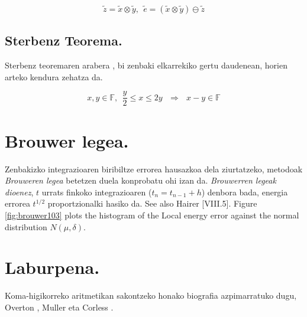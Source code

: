 \begin{equation*}
\tilde{z}=\tilde{x}\otimes\tilde{y}, \ \ \tilde{e}=(\tilde{x}\otimes\tilde{y})\ominus \tilde{z}
\end{equation*}


\subsection*{Sterbenz Teorema.}
Sterbenz teoremaren arabera \cite{Sterbenz1973}, bi zenbaki elkarrekiko  gertu daudenean,  horien arteko kendura zehatza da.

\begin{equation}
\label{eq:4311}
x,y \in \mathbb{F}, \ \ \frac{y}{2}\leq x \leq 2y \ \ \ \Rightarrow \ \ \ x-y\in \mathbb{F}
\end{equation}


\section{Brouwer legea.}

Zenbakizko integrazioaren biribiltze errorea hausazkoa dela ziurtatzeko, metodoak \emph{Brouweren legea} \cite{Brouwer1937} betetzen duela konprobatu ohi izan da. \emph{Brouwerren legeak dioenez}, $t$ urrats finkoko integrazioaren ($t_n=t_{n-1}+h$) denbora bada, energia errorea $t^{1/2}$ proportzionalki hasiko da.  See also Hairer \cite{Hairer2006}[VIII.5]. Figure \ref{fig:brouwer103} plots the histogram of the Local energy error against the normal distribution $N(\mu, \delta)$.

\section{Laburpena.}

Koma-higikorreko aritmetikan sakontzeko honako biografia azpimarratuko dugu, Overton \cite{Overton2001}, Muller  \cite{Muller2009} eta Corless \cite{Corless2013}.

